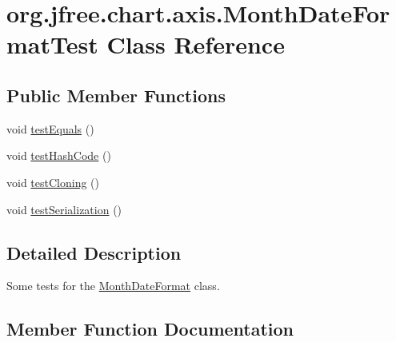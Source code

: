 \hypertarget{classorg_1_1jfree_1_1chart_1_1axis_1_1_month_date_format_test}{}\section{org.\+jfree.\+chart.\+axis.\+Month\+Date\+Format\+Test Class Reference}
\label{classorg_1_1jfree_1_1chart_1_1axis_1_1_month_date_format_test}
\subsection*{Public Member Functions}
\begin{DoxyCompactItemize}
\item 
void \mbox{\hyperlink{classorg_1_1jfree_1_1chart_1_1axis_1_1_month_date_format_test_a011c480f678598806cd1250e9c694219}{test\+Equals}} ()
\item 
void \mbox{\hyperlink{classorg_1_1jfree_1_1chart_1_1axis_1_1_month_date_format_test_abc8f20f9527ff06437e067cdba47973b}{test\+Hash\+Code}} ()
\item 
void \mbox{\hyperlink{classorg_1_1jfree_1_1chart_1_1axis_1_1_month_date_format_test_a94dce43948409923f1304a63bfdec933}{test\+Cloning}} ()
\item 
void \mbox{\hyperlink{classorg_1_1jfree_1_1chart_1_1axis_1_1_month_date_format_test_a0d6cf28a2200d9ac0ca4cb1fdfc21abf}{test\+Serialization}} ()
\end{DoxyCompactItemize}


\subsection{Detailed Description}
Some tests for the \mbox{\hyperlink{classorg_1_1jfree_1_1chart_1_1axis_1_1_month_date_format}{Month\+Date\+Format}} class. 

\subsection{Member Function Documentation}
\mbox{\label{classorg_1_1jfree_1_1chart_1_1axis_1_1_month_date_format_test_a94dce43948409923f1304a63bfdec933}} 
